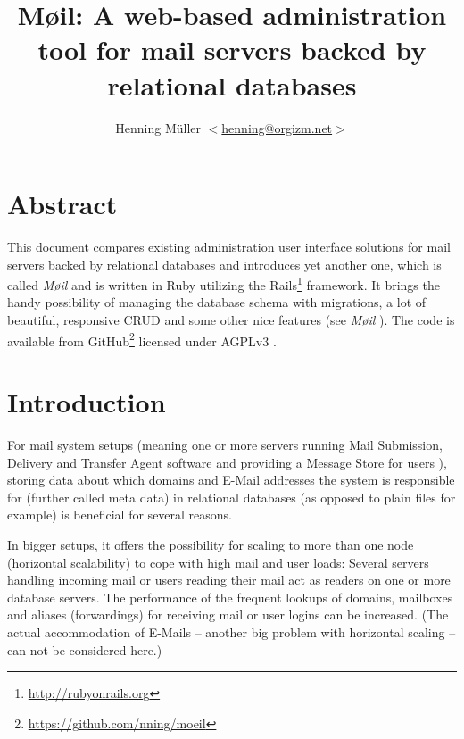 \documentclass[12pt,a4paper]{scrartcl}
\begin{document}
	\title{Møil: A web-based administration tool for mail servers backed by relational databases}
	\author{Henning Müller $<$\href{mailto:henning@orgizm.net}{henning@orgizm.net}$>$}
	\date{}

	\maketitle


	\section*{Abstract}
		This document compares existing administration user interface solutions
		for mail servers backed by relational databases and introduces yet
		another one, which is called \emph{Møil} and is written in Ruby
		utilizing the \ac{Rails}\footnote{\url{http://rubyonrails.org}}
		framework. It brings the handy possibility of managing the database
		schema with migrations, a lot of beautiful, responsive \acs{CRUD} and
		some other nice features (see \emph{Møil} ).
		The code is available from
		GitHub\footnote{\url{https://github.com/nning/moeil}} licensed under
		AGPLv3 \cite{agpl}.

	\section*{Introduction}

		For mail system setups (meaning one or more servers running Mail
		Submission, Delivery and Transfer Agent software and providing a
		Message Store for users \cite{mail-architecture}), storing data about
		which domains and E-Mail addresses the system is responsible for
		(further called meta data) in relational databases (as opposed to plain
		files for example) is beneficial for several reasons.


		In bigger setups, it offers the possibility for scaling to more than
		one node (horizontal scalability) to cope with high mail and user
		loads: Several servers handling incoming mail or users reading their
		mail act as readers on one or more database servers. The performance of
		the frequent lookups of domains, mailboxes and aliases (forwardings)
		for receiving mail or user logins can be increased. (The actual
		accommodation of E-Mails -- another big problem with horizontal scaling
		-- can not be considered here.)
\end{document}
